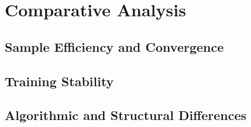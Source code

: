 \chapter {Comparative Analysis}
\label{chap:comparativeanalysis}

\section{Sample Efficiency and Convergence}

\section{Training Stability}

\section{Algorithmic and Structural Differences}
\label{sec:algandstructdifferences}